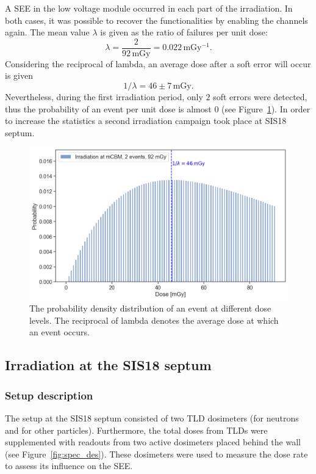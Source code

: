 A \gls{SEE} in the low voltage module occurred in each part of the irradiation. In both cases, it was possible to recover the functionalities by enabling the channels again. The mean value $\lambda$ is given as the ratio of failures per unit dose:
\begin{equation}
    \lambda = \frac{2}{92\,\mathrm{mGy}} = 0.022\,\mathrm{mGy^{-1}}.
\end{equation}
Considering the reciprocal of lambda,  an average dose after a soft error will occur is given 
\begin{equation}
    1/\lambda = 46\pm 7\,\mathrm{mGy}.
\end{equation}
Nevertheless, during the first irradiation period, only $2$ soft errors were detected, thus the probability of an event per unit dose is almost 0 (see Figure~\ref{fig:crate_prob}). In order to increase the statistics a second irradiation campaign took place at SIS18 septum.

\begin{figure}[!h]
    \centering
    \includegraphics[width=0.65\columnwidth]{Chapter4/images/MCBM_crate.png}
    \caption{The probability density distribution of an event at different dose levels. The reciprocal of lambda denotes the average dose at which an event occurs.}
    \label{fig:crate_prob}
\end{figure}


\newpage
\subsection{Irradiation at the SIS18 septum}
\subsubsection{Setup description}
The setup at the SIS18 septum consisted of two \gls{TLD} dosimeters (for neutrons and for other particles). Furthermore, the total doses from TLDs were supplemented with readouts from two active dosimeters placed behind the wall (see Figure~\ref{fig:spec_des}). These dosimeters were used to measure the dose rate to assess its influence on the \gls{SEE}.


